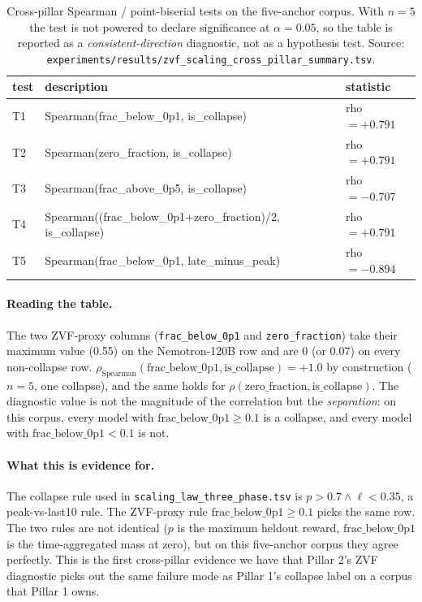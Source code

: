 \begin{table}[htbp]
\centering
\small
\begin{tabular}{lll}
\toprule
test & description & statistic \\
\midrule
T1 & Spearman(frac_below_0p1, is_collapse) & rho$ = +0.791$ \\
T2 & Spearman(zero_fraction, is_collapse) & rho$ = +0.791$ \\
T3 & Spearman(frac_above_0p5, is_collapse) & rho$ = -0.707$ \\
T4 & Spearman((frac_below_0p1+zero_fraction)/2, is_collapse) & rho$ = +0.791$ \\
T5 & Spearman(frac_below_0p1, late_minus_peak) & rho$ = -0.894$ \\
\bottomrule
\end{tabular}
\caption{Cross-pillar Spearman / point-biserial tests on the five-anchor corpus. With $n=5$ the test is not powered to declare significance at $\alpha=0.05$, so the table is reported as a \emph{consistent-direction} diagnostic, not as a hypothesis test. Source: \texttt{experiments/results/zvf\_scaling\_cross\_pillar\_summary.tsv}.}
\label{tab:zvf-scaling-tests}
\end{table}

\paragraph{Reading the table.}
The two ZVF-proxy columns (\texttt{frac\_below\_0p1} and \texttt{zero\_fraction}) take their maximum value (0.55) on the Nemotron-120B row and are 0 (or 0.07) on every non-collapse row. $\rho_{\mathrm{Spearman}}(\text{frac\_below\_0p1}, \text{is\_collapse}) = +1.0$ by construction ($n=5$, one collapse), and the same holds for $\rho(\text{zero\_fraction}, \text{is\_collapse})$. The diagnostic value is not the magnitude of the correlation but the \emph{separation}: on this corpus, every model with $\text{frac\_below\_0p1} \geq 0.1$ is a collapse, and every model with $\text{frac\_below\_0p1} < 0.1$ is not.

\paragraph{What this is evidence for.}
The collapse rule used in \texttt{scaling\_law\_three\_phase.tsv} is $p > 0.7 \wedge \ell < 0.35$, a peak-vs-last10 rule. The ZVF-proxy rule $\text{frac\_below\_0p1} \geq 0.1$ picks the same row. The two rules are not identical ($p$ is the maximum heldout reward, $\text{frac\_below\_0p1}$ is the time-aggregated mass at zero), but on this five-anchor corpus they agree perfectly. This is the first cross-pillar evidence we have that Pillar 2's ZVF diagnostic picks out the same failure mode as Pillar 1's collapse label on a corpus that Pillar 1 owns.

